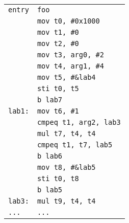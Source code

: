 \begin{tabular}{ll}
\texttt{entry} & \texttt{foo} \\
\texttt{} & \texttt{mov t0, \#0x1000} \\
\texttt{} & \texttt{mov t1, \#0} \\
\texttt{} & \texttt{mov t2, \#0} \\
\texttt{} & \texttt{mov t3, arg0, \#2} \\
\texttt{} & \texttt{mov t4, arg1, \#4} \\
\texttt{} & \texttt{mov t5, \#\&lab4} \\
\texttt{} & \texttt{sti t0, t5} \\
\texttt{} & \texttt{b lab7} \\
\texttt{lab1:} & \texttt{mov t6, \#1} \\
\texttt{} & \texttt{cmpeq t1, arg2, lab3} \\
\texttt{} & \texttt{mul t7, t4, t4} \\
\texttt{} & \texttt{cmpeq t1, t7, lab5} \\
\texttt{} & \texttt{b lab6} \\
\texttt{} & \texttt{mov t8, \#\&lab5} \\
\texttt{} & \texttt{sti t0, t8} \\
\texttt{} & \texttt{b lab5} \\
\texttt{lab3:} & \texttt{mul t9, t4, t4} \\
\texttt{...} & \texttt{...} \\

\end{tabular}